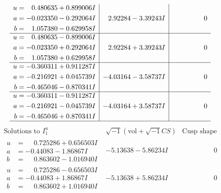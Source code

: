 \documentclass[1p]{elsarticle_modified}
\theoremstyle{definition}
\newcommand{\I}{\sqrt{-1}}
\begin{document}
$$\begin{array}{c|c|c}
\begin{aligned}
u &= \phantom{-}0.480635 + 0.899006 I \\
a &= -0.023350 - 0.292064 I \\
b &= \phantom{-}1.057380 - 0.629958 I\end{aligned}
 & \phantom{-}2.92284 - 3.39243 I & \phantom{-0.000000 } 0 \\ \hline\begin{aligned}
u &= \phantom{-}0.480635 - 0.899006 I \\
a &= -0.023350 + 0.292064 I \\
b &= \phantom{-}1.057380 + 0.629958 I\end{aligned}
 & \phantom{-}2.92284 + 3.39243 I & \phantom{-0.000000 } 0 \\ \hline\begin{aligned}
u &= -0.360311 + 0.911287 I \\
a &= -0.216921 + 0.045739 I \\
b &= -0.465046 - 0.870341 I\end{aligned}
 & -4.03164 - 3.58737 I & \phantom{-0.000000 } 0 \\ \hline\begin{aligned}
u &= -0.360311 - 0.911287 I \\
a &= -0.216921 - 0.045739 I \\
b &= -0.465046 + 0.870341 I\end{aligned}
 & -4.03164 + 3.58737 I & \phantom{-0.000000 } 0\\
 \hline 
 \end{array}$$\newpage$$\begin{array}{c|c|c}  
\text{Solutions to }I^u_{1}& \I (\text{vol} + \sqrt{-1}CS) & \text{Cusp shape}\\
 \hline 
\begin{aligned}
u &= \phantom{-}0.725286 + 0.656503 I \\
a &= -0.44083 - 1.86867 I \\
b &= \phantom{-}0.863602 - 1.016940 I\end{aligned}
 & -5.13638 - 5.86234 I & \phantom{-0.000000 } 0 \\ \hline\begin{aligned}
u &= \phantom{-}0.725286 - 0.656503 I \\
a &= -0.44083 + 1.86867 I \\
b &= \phantom{-}0.863602 + 1.016940 I\end{aligned}
 & -5.13638 + 5.86234 I & \phantom{-0.000000 } 0 \\ \hline\begin{aligned}

\end{aligned}
\end{array}$$
\end{document}
